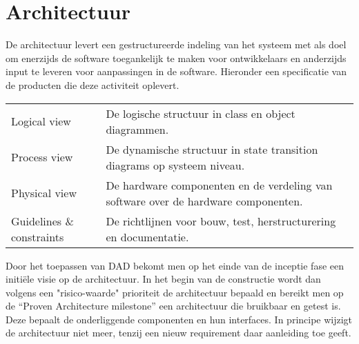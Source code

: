
\section{Architectuur}

De architectuur levert een gestructureerde indeling van het systeem met als doel om enerzijds de software
toegankelijk te maken voor ontwikkelaars en anderzijds input te leveren voor aanpassingen in de software. Hieronder
een specificatie van de producten die deze activiteit oplevert.

{\small\sf
\begin{center}
\begin{tabular}{lp{30em}}
Logical view & De logische structuur in class en object diagrammen.\\
Process view & De dynamische structuur in state
transition diagrams op systeem niveau.\\
Physical view &  De hardware componenten en de verdeling van
software over de hardware componenten.\\
Guidelines \& constraints & De richtlijnen voor bouw,
test, herstructurering en documentatie.\\
\end{tabular}
\end{center}
}

Door het toepassen van DAD bekomt men op het einde van de inceptie fase een
initi\"ele visie op de architectuur. In het begin van de constructie wordt dan
volgens een "risico-waarde" prioriteit de architectuur bepaald en bereikt men
op de ``Proven Architecture milestone'' een architectuur die bruikbaar en getest
is. Deze bepaalt de onderliggende componenten en hun interfaces.
In principe wijzigt de architectuur niet meer, tenzij een nieuw requirement
daar aanleiding toe geeft.